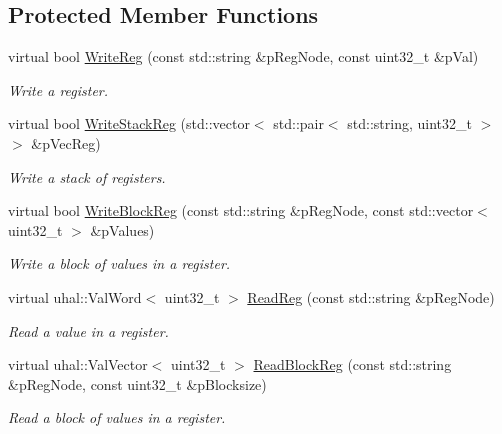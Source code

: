 \subsection*{Protected Member Functions}
\begin{DoxyCompactItemize}
\item 
virtual bool \hyperlink{class_ph2___hw_interface_1_1_reg_manager_a31174516fef6706c88c3f59dd93e4fdf}{Write\-Reg} (const std\-::string \&p\-Reg\-Node, const uint32\-\_\-t \&p\-Val)
\begin{DoxyCompactList}\small\item\em Write a register. \end{DoxyCompactList}\item 
virtual bool \hyperlink{class_ph2___hw_interface_1_1_reg_manager_ac67c49c17b1c171ef9836ae463d8bc18}{Write\-Stack\-Reg} (std\-::vector$<$ std\-::pair$<$ std\-::string, uint32\-\_\-t $>$ $>$ \&p\-Vec\-Reg)
\begin{DoxyCompactList}\small\item\em Write a stack of registers. \end{DoxyCompactList}\item 
virtual bool \hyperlink{class_ph2___hw_interface_1_1_reg_manager_a888f5cccb05daa28896cf622abfdcbd6}{Write\-Block\-Reg} (const std\-::string \&p\-Reg\-Node, const std\-::vector$<$ uint32\-\_\-t $>$ \&p\-Values)
\begin{DoxyCompactList}\small\item\em Write a block of values in a register. \end{DoxyCompactList}\item 
virtual uhal\-::\-Val\-Word$<$ uint32\-\_\-t $>$ \hyperlink{class_ph2___hw_interface_1_1_reg_manager_a077e0a18592206365150680213345112}{Read\-Reg} (const std\-::string \&p\-Reg\-Node)
\begin{DoxyCompactList}\small\item\em Read a value in a register. \end{DoxyCompactList}\item 
virtual uhal\-::\-Val\-Vector$<$ uint32\-\_\-t $>$ \hyperlink{class_ph2___hw_interface_1_1_reg_manager_a6481c211d27badc409ff0e7af20575e4}{Read\-Block\-Reg} (const std\-::string \&p\-Reg\-Node, const uint32\-\_\-t \&p\-Blocksize)
\begin{DoxyCompactList}\small\item\em Read a block of values in a register. \end{DoxyCompactList}\item 

\end{DoxyCompactItemize}
